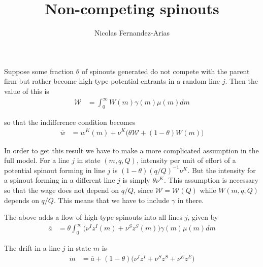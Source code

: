 \documentclass[12pt,english]{article}
\theoremstyle{remark}
\begin{document}
	
	
	
\title{Non-competing spinouts}
\author{Nicolas Fernandez-Arias}
\maketitle

Suppose some fraction $\theta$ of spinouts generated do not compete with the parent firm but rather become high-type potential entrants in a random line $j$. Then the value of this is
\begin{align*}
	\mathcal{W} &= \int_0^{\infty} W(m) \gamma(m) \mu(m)dm
\end{align*}

so that the indifference condition becomes
\begin{align*}
	\overline{w} &= w^K(m) + \nu^K \Big( \theta \mathcal{W} + (1-\theta) W(m) \Big)
\end{align*}

In order to get this result we have to make a more complicated assumption in the full model. For a line $j$ in state $(m,q,Q)$, intensity per unit of effort of a potential spinout forming in line $j$ is $(1-\theta) (q/Q)^{-1} \nu^K$. But the intensity for a spinout forming in a different line $j$ is simply $\theta \nu^K$. This assumption is necessary so that the wage does not depend on $q/Q$, since $\mathcal{W} = \mathcal{W}(Q)$ while $W(m,q,Q)$ depends on $q/Q$. This means that we have to include $\gamma$ in there. 

The above adds a flow of high-type spinouts into all lines $j$, given by
\begin{align*}
	\overline{a} &= \theta \int_0^{\infty} \Big( \nu^I z^I(m) + \nu^S z^S(m) \Big) \gamma(m) \mu(m) dm 
\end{align*}

The drift in a line $j$ in state $m$ is
\begin{align*}
	\dot{m} &= \overline{a} + (1-\theta) \Big(\nu^I z^I + \nu^S z^S + \nu^E z^E \Big) 
\end{align*}
\end{document}
